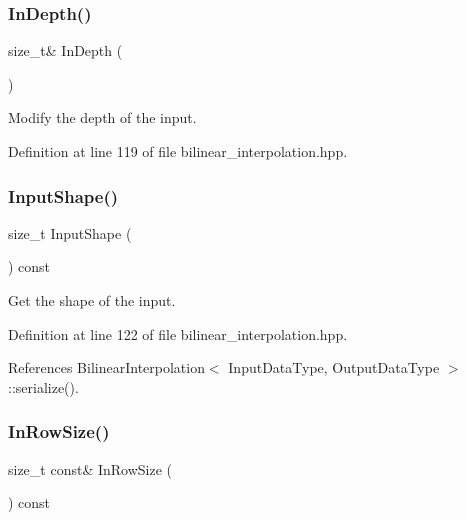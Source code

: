 \subsubsection{In\+Depth()\hspace{0.1cm}{\footnotesize\ttfamily [2/2]}}
{\footnotesize\ttfamily size\+\_\+t\& In\+Depth (\begin{DoxyParamCaption}{ }\end{DoxyParamCaption})\hspace{0.3cm}{\ttfamily [inline]}}



Modify the depth of the input. 



Definition at line 119 of file bilinear\+\_\+interpolation.\+hpp.

\mbox{\label{classmlpack_1_1ann_1_1BilinearInterpolation_a13ab93f234244a68f6ade76287284447}} 
\subsubsection{Input\+Shape()}
{\footnotesize\ttfamily size\+\_\+t Input\+Shape (\begin{DoxyParamCaption}{ }\end{DoxyParamCaption}) const\hspace{0.3cm}{\ttfamily [inline]}}



Get the shape of the input. 



Definition at line 122 of file bilinear\+\_\+interpolation.\+hpp.



References Bilinear\+Interpolation$<$ Input\+Data\+Type, Output\+Data\+Type $>$\+::serialize().

\mbox{\label{classmlpack_1_1ann_1_1BilinearInterpolation_a913067c139b71a0e8ca5f1c28244becf}} 
\subsubsection{In\+Row\+Size()\hspace{0.1cm}{\footnotesize\ttfamily [1/2]}}
{\footnotesize\ttfamily size\+\_\+t const\& In\+Row\+Size (\begin{DoxyParamCaption}{ }\end{DoxyParamCaption}) const\hspace{0.3cm}{\ttfamily [inline]}}



